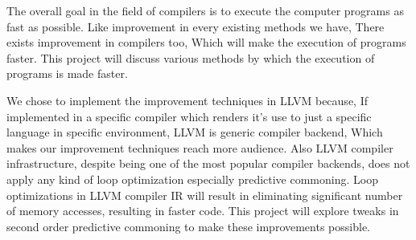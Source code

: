 The overall goal in the field of compilers is to execute the computer programs as fast as possible. Like improvement in every existing methods we have, There exists improvement in compilers too, Which will make the execution of programs faster. This project will discuss various methods by which the execution of programs is made faster.

We chose to implement the improvement techniques in LLVM because, If implemented in a specific compiler which renders it’s use to just a specific language in specific environment, LLVM is generic compiler backend, Which makes our improvement techniques reach more audience. Also LLVM compiler infrastructure, despite being one of the most popular compiler backends, does not apply any kind of loop optimization especially predictive commoning. Loop optimizations in LLVM compiler IR will result in eliminating significant number of memory accesses, resulting in faster code. This project will explore tweaks in second order predictive commoning to make these improvements possible.